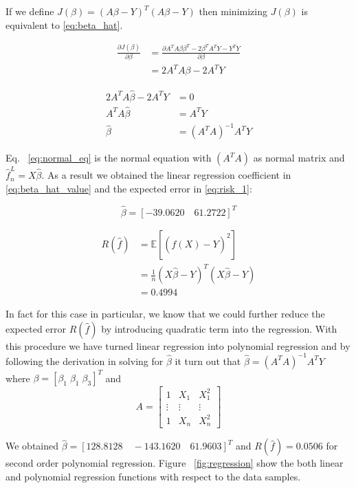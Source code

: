 \documentclass[a4paper]{article}
\begin{document}
	If we define $J(\beta) = (A\beta - Y)^T(A\beta - Y)$ then minimizing $J(\beta)$ is equivalent to \eqref{eq:beta_hat}.
	
	\begin{align}
		\frac{\partial J(\beta)}{\partial \beta} &= \frac{\partial A^TA\beta\beta^T - 2\beta^TA^TY - Y^TY}{\partial \beta} \\ 
			&= 2A^TA\beta - 2A^TY
	\end{align}
	
	\begin{align}
		2A^TA\hat{\beta} - 2A^TY &= 0 \\ 
		A^TA\hat{\beta} &= A^TY \\ 
		\hat{\beta} &= (A^TA)^{-1}A^TY \label{eq:normal_eq}
	\end{align}
	
	Eq. ~\eqref{eq:normal_eq} is the normal equation with $(A^TA)$ as normal matrix and $\hat{f}_n^L = X\hat{\beta}$. As a result we obtained the linear regression coefficient in \eqref{eq:beta_hat_value} and the expected error in \eqref{eq:risk_1}:
	
	\begin{equation} \label{eq:beta_hat_value}
		\hat{\beta} = [-39.0620 \quad 61.2722]^T
	\end{equation}
	
	\begin{align}
		R(\hat{f}) &= \mathbb{E}[(\hat{f}(X) - Y)^2] \\ 
			&= \frac{1}{n} (X\hat{\beta} - Y)^T(X\hat{\beta} - Y) \\
			&= 0.4994 \label{eq:risk_1}
	\end{align}
	
	In fact for this case in particular, we know that we could further reduce the expected error $R(\hat{f})$ by introducing quadratic term into the regression. With this procedure we have turned linear regression into polynomial regression and by following the derivation in solving for $\hat{\beta}$ it turn out that $\hat{\beta} = (A^TA)^{-1}A^TY$ where $\beta = [\beta_1\;\beta_1\;\beta_3]^T$ and 
	$$ A = \begin{bmatrix} 
				1 & X_1 & X_1^2 \\ 
				\vdots & \vdots & \vdots \\ 
				1 & X_n & X_n^2
			\end{bmatrix}$$
			
	We obtained $\hat{\beta} = [128.8128 \quad -143.1620 \quad 61.9603]^T$ and $R(\hat{f}) = 0.0506$ for second order polynomial regression. Figure ~\ref{fig:regression} show the both linear and polynomial regression functions with respect to the data samples.
	
\end{document}
